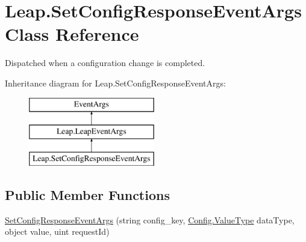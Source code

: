 \hypertarget{class_leap_1_1_set_config_response_event_args}{}\section{Leap.\+Set\+Config\+Response\+Event\+Args Class Reference}
\label{class_leap_1_1_set_config_response_event_args}


Dispatched when a configuration change is completed.  


Inheritance diagram for Leap.\+Set\+Config\+Response\+Event\+Args\+:\begin{figure}[H]
\begin{center}
\leavevmode
\includegraphics[height=3.000000cm]{class_leap_1_1_set_config_response_event_args}
\end{center}
\end{figure}
\subsection*{Public Member Functions}
\begin{DoxyCompactItemize}
\item 
\mbox{\hyperlink{class_leap_1_1_set_config_response_event_args_a1af9053af3f5a82c10f227ea10f7423f}{Set\+Config\+Response\+Event\+Args}} (string config\+\_\+key, \mbox{\hyperlink{class_leap_1_1_config_aee9819af7eacacc324aa72619310a9d8}{Config.\+Value\+Type}} data\+Type, object value, uint request\+Id)
\end{DoxyCompactItemize}
